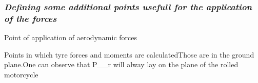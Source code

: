 \documentclass{article}
\begin{document}
\subsubsection{\textbf{\textit{Defining some additional points usefull for the application of the forces}}}
\begin{maplegroup}
\begin{Maple Normal}{
Point of application of aerodynamic forces}\end{Maple Normal}

\end{maplegroup}
\begin{maplegroup}
\begin{mapleinput}
\end{mapleinput}
\end{maplegroup}
\begin{maplegroup}
\begin{Maple Normal}{
Points in which tyre forces and moments are calculatedThose are in the ground plane.One can observe that P\_\_r will alway lay on the plane of the rolled motorcycle}\end{Maple Normal}

\end{maplegroup}
\begin{maplegroup}
\begin{mapleinput}
\end{mapleinput}
\mapleresult
\begin{maplelatex}
\end{maplelatex}
\end{maplegroup}
\begin{maplegroup}
\begin{mapleinput}
\end{mapleinput}
\mapleresult
\begin{maplelatex}
\end{maplelatex}
\end{maplegroup}
\end{document}
